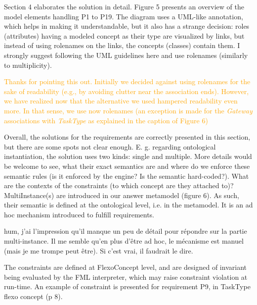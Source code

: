 \documentclass[10pt]{article}
\begin{document}
\begin{response}{Section 4 elaborates the solution in detail. Figure 5 presents an overview of the model elements handling P1 to P19. The diagram uses a UML-like annotation, which helps in making it understandable, but it also has a strange decision: roles (attributes) having a modeled concept as their type are visualized by links, but instead of using rolenames on the links, the concepts (classes) contain them. I strongly suggest following the UML guidelines here and use rolenames (similarly to multiplicity).}

\textcolor{orange}{Thanks for pointing this out. Initially we decided against using rolenames for the sake of readability (e.g., by avoiding clutter near the association ends). However, we have realized now that the alternative we used hampered readability even more. In that sense, we use now rolenames (an exception is made for the \emph{Gateway} associations with \emph{TaskType} as explained in the caption of Figure 6)}

\end{response}


\begin{response}{Overall, the solutions for the requirements are correctly presented in this section, but there are some spots not clear enough. E. g. regarding ontological instantiation, the solution uses two kinds: single and multiple. More details would be welcome to see, what their exact semantics are and where do we enforce these semantic rules (is it enforced by the engine? Is the semantic hard-coded?). What are the contexts of the constraints (to which concept are they attached to)?} 
MultiInstance(s) are introduced in our answer metamodel (figure 6). As such, their semantic is defined at the ontological level, i.e. in the metamodel. It is an ad hoc mechanism introduced to fulfill requirements. 

{\color{red}hum, j'ai l'impression qu'il manque un peu de détail pour répondre sur la partie multi-instance. Il me semble qu'en plus d'être ad hoc, le mécanisme est manuel (mais je me trompe peut être). Si c'est vrai, il faudrait le dire.}


The constraints are defined at FlexoConcept level, and are designed of invariant being evaluated by the FML interpreter, which may raise constraint violation at run-time. An example of constraint is presented for requirement P9, in TaskType flexo concept (p 8).

\end{response}
\end{document}
